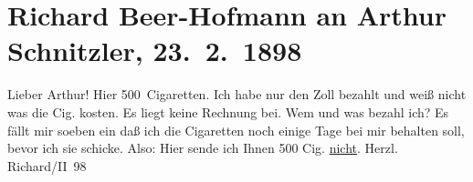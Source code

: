 

               \section[Richard Beer-Hofmann an Arthur Schnitzler, 23. 2. 1898]{ Richard Beer-Hofmann an Arthur Schnitzler, 23. 2. 1898}\nopagebreak{}\rehead{ }\begin{ledgroupsized}[t]{13cm}\normalsize\beginnumbering{} \toendnotes[C]{\smallbreak\pagebreak[2]} 
\pstart
           \noindent{}{\pb}Lieber Arthur!
               Hier 500 Cigaretten. Ich habe nur den Zoll bezahlt und weiß nicht was die
               Cig. kosten. Es liegt keine Rechnung bei. Wem und was bezahl ich? Es fällt mir soeben
               ein daß ich die Cigaretten {\pb}noch
               einige Tage bei mir behalten soll, bevor ich sie schicke. Also: Hier sende ich Ihnen
               500 Cig. \uline{nicht}.\pend
           \pstart Herzl. \spacefill\mbox{Richard}\pend{}/II 98\pend
           \endnumbering{}\end{ledgroupsized}  \newcommand{\dateiname}{L00776}\newcommand{\titel}{Richard Beer-Hofmann an Arthur Schnitzler, 23. 2. 1898}\newcommand{\editorInnen}{Martin Anton Müller und Gerd-Hermann Susen}
      
